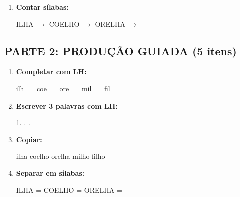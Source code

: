 \begin{exercicio}
\begin{enumerate}
  \item \textbf{Contar sílabas:}
  \begin{center}
  ILHA $\rightarrow$ \underline{\hspace{0.9cm}} \quad COELHO $\rightarrow$ \underline{\hspace{0.9cm}} \quad ORELHA $\rightarrow$ \underline{\hspace{0.9cm}}
  \end{center}

\end{enumerate}

\subsection*{PARTE 2: PRODUÇÃO GUIADA (5 itens)}

\begin{enumerate}[resume]

  \item \textbf{Completar com LH:}
  \begin{center}
  ilh\underline{~~~} \quad coe\underline{~~~} \quad ore\underline{~~~} \quad mil\underline{~~~} \quad fil\underline{~~~}
  \end{center}

  \item \textbf{Escrever 3 palavras com LH:}
  \begin{center}
  1. \underline{\hspace{3cm}} . \underline{\hspace{3cm}} . \underline{\hspace{3cm}}
  \end{center}

  \item \textbf{Copiar:}
  \begin{center}
  ilha \quad coelho \quad orelha \quad milho \quad filho
  \end{center}

  \item \textbf{Separar em sílabas:}
  \begin{center}
  ILHA = \underline{\hspace{1cm}} \underline{\hspace{1cm}} \quad COELHO = \underline{\hspace{1cm}} \underline{\hspace{1cm}} \quad ORELHA = \underline{\hspace{1cm}} \underline{\hspace{1cm}}
  \end{center}


\end{enumerate}
\end{exercicio}
